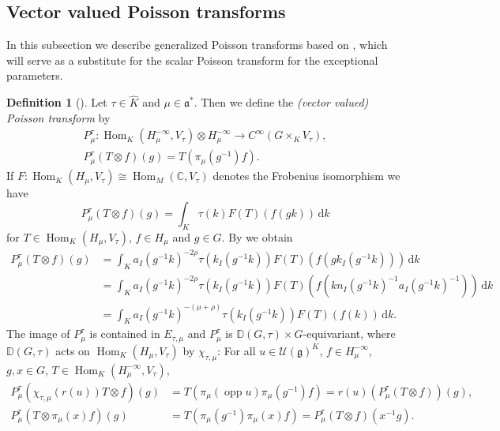 \documentclass[JEP,XML,SOM,NoFloatCountersInSection,Unicode,published]{cedram}
\theoremstyle{definition}
\newtheorem{definition}[theorem]{Definition}
\newcommand{\mc}[1]{\ensuremath{\mathcal{#1}}}
\newcommand{\mf}[1]{\ensuremath{\mathfrak{#1}}}
\newcommand{\on}[1]{\ensuremath{\operatorname{#1}}}
\newcommand{\Hom}[3]{\ensuremath{\on{Hom}_{#1}(#2,#3)}}
\newcommand{\rhoa}{\ensuremath{\rho}}
\newcommand{\C}{\ensuremath{\mathbb{C}}}
\newcommand{\ps}[2]{\ensuremath{H_{#2}}}
\newcommand{\psd}[2]{\ensuremath{H_{#2}^{-\infty}}}
\newcommand{\pstd}[1]{\ensuremath{H_{#1}^{-\infty}}}
\newcommand{\intd}{\ensuremath{\,\mathrm{d}}}
\begin{document}
\subsection{Vector valued Poisson transforms}
In this subsection we describe generalized Poisson transforms based on \cite{Ol}, which will serve as a substitute for the scalar Poisson transform for the exceptional parameters.

\begin{definition}[]\label{def:PoissonTransformation}
Let $\tau\in\hat K$ and $\mu\in\mf a^*$. Then we define the \emph{(vector valued) Poisson transform} by
\begin{equation}
\begin{gathered}
P_{\mu}^\tau: \Hom{K}{\psd{\sigma}{\mu}}{V_\tau}\otimes\psd{\sigma}{\mu}\to C^\infty(G\times_K V_\tau),\\
P_{\mu}^\tau(T\otimes f)(g)=T(\pi_{\mu}(g^{-1})f).\label{eq:olbrich_Poisson_G}
\end{gathered}
\end{equation}
If $F:\Hom{K}{\ps{\sigma}{\mu}}{V_\tau}\cong\Hom{M}{\C}{V_\tau}$ denotes the Frobenius isomorphism we have
\begin{equation}\label{eq:PT_def_int}
P_{\mu}^\tau(T\otimes f)(g)=\int_K\tau(k)F(T)(f(gk))\intd k
\end{equation}
for $T\in\Hom{K}{\ps{\sigma}{\mu}}{V_\tau},\, f\in\ps{\sigma}{\mu}$ and $g\in G$. By \cite[Ch.\,I, \S 5.3, Eq.\,(25)]{GAGA} we obtain
\begin{align*}
P_{\mu}^\tau(T\otimes f)(g)&=\int_K a_{I}(g^{-1}k)^{-2\rhoa}\tau(k_{I}(g^{-1}k))F(T)(f(gk_{I}(g^{-1}k)))\intd k\\
&=\int_K a_{I}(g^{-1}k)^{-2\rhoa}\tau(k_{I}(g^{-1}k))F(T)(f(kn_{I}(g^{-1}k)^{-1}a_{I}(g^{-1}k)^{-1}))\intd k\\
&=\int_K a_{I}(g^{-1}k)^{-(\mu+\rhoa)}\tau(k_{I}(g^{-1}k))F(T)(f(k))\intd k.
\end{align*}
The image of $P_{\mu}^\tau$ is contained in $E_{\tau,\mu}$ and $P_{\mu}^\tau$ is $\mathbb{D}(G,\tau)\times G$-equivariant, where $\mathbb{D}(G,\tau)$ acts on $\Hom{K}{\ps{\sigma}{\mu}}{V_\tau}$ by $\chi_{\tau,\mu}$: For all $u\in\mc U(\mf g)^K$, $f\in\pstd{\mu}$, $g,x\in G$, $T\in\Hom{K}{\psd{\sigma}{\mu}}{V_\tau}$,
\begin{align*}
P_{\mu}^\tau(\chi_{\tau,\mu}(r(u))T\otimes f)(g)&=T(\pi_{\mu}(\on{opp}u)\pi_{\mu}(g^{-1})f)=r(u)(P_{\mu}^\tau(T\otimes f))(g),\\
P_{\mu}^\tau(T\otimes\pi_\mu(x)f)(g)&=T(\pi_\mu(g^{-1})\pi_\mu(x)f)=P_{\mu}^\tau(T\otimes f)(x^{-1}g).
\end{align*}
\end{definition}
\end{document}
